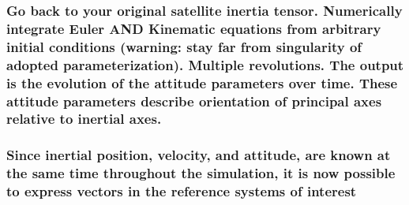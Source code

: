 \subsubsection{Go back to your original satellite inertia tensor. Numerically integrate Euler AND Kinematic equations from arbitrary initial conditions (warning: stay far from singularity of adopted parameterization). Multiple revolutions. The output is the evolution of the attitude parameters over time. These attitude parameters describe orientation of principal axes relative to inertial axes.}

\subsubsection{Since inertial position, velocity, and attitude, are known at the same time throughout the simulation, it is now possible to express vectors in the reference systems of interest}